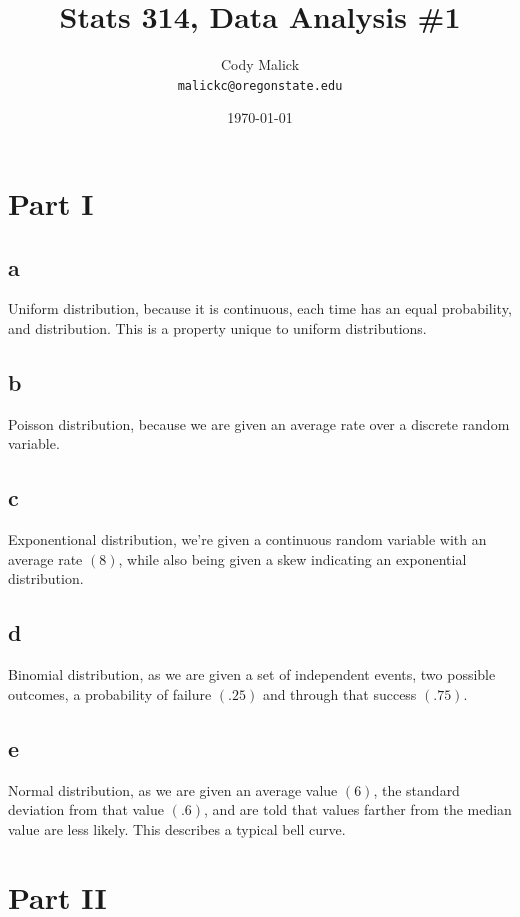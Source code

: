 \documentclass[10pt,letterpaper]{article}
\begin{document}
  \title{Stats 314, Data Analysis \#1}
  \author{Cody Malick\\
  \texttt{malickc@oregonstate.edu}}
  \date{\today}
  \maketitle

\section*{Part I}
\subsection*{a}
Uniform distribution, because it is continuous, each time has an equal
probability, and distribution. This is a property unique to uniform
distributions.

\subsection*{b}
Poisson distribution, because we are given an average rate over a discrete
random variable. 

\subsection*{c}
Exponentional distribution, we're given a continuous random variable with an
average rate $(8)$, while also being given a skew indicating an exponential
distribution.

\subsection*{d}
Binomial distribution, as we are given a set of independent events, two 
possible outcomes, a probability of failure $(.25)$ and through that success
$(.75)$. 

\subsection*{e}
Normal distribution, as we are given an average value $(6)$, the standard
deviation from that value $(.6)$, and are told that values farther from the
median value are less likely. This describes a typical bell curve. 

\section*{Part II}
\end{document}
